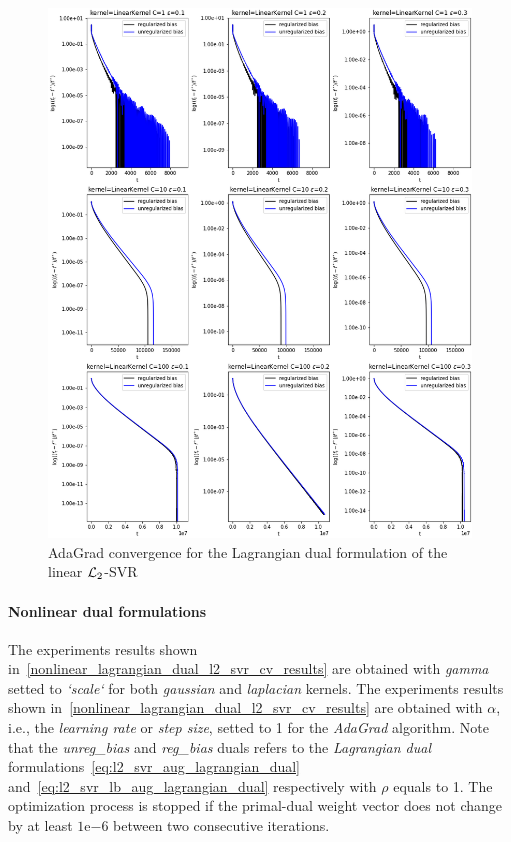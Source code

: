

\begin{figure}[H]
	\centering
	\includegraphics[scale=0.55]{img/linear_lagrangian_dual_l2_svr_loss_history}
	\caption{AdaGrad convergence for the Lagrangian dual formulation of the linear $\protect \mathcal{L}_2$-SVR}
	\label{fig:linear_lagrangian_dual_l2_svr_loss_history}
\end{figure}

\paragraph{Nonlinear dual formulations}

The experiments results shown in~\ref{nonlinear_lagrangian_dual_l2_svr_cv_results} are obtained with \emph{gamma} setted to \emph{`scale`} for both \emph{gaussian} and \emph{laplacian} kernels. The experiments results shown in~\ref{nonlinear_lagrangian_dual_l2_svr_cv_results} are obtained with $\alpha$, i.e., the \emph{learning rate} or \emph{step size}, setted to 1 for the \emph{AdaGrad} algorithm. Note that the \emph{unreg\_bias} and \emph{reg\_bias} duals refers to the \emph{Lagrangian dual} formulations~\eqref{eq:l2_svr_aug_lagrangian_dual} and~\eqref{eq:l2_svr_lb_aug_lagrangian_dual} respectively with $\rho$ equals to 1. The optimization process is stopped if the primal-dual weight vector does not change by at least $1\mathrm{e}{-6}$  between two consecutive iterations.

